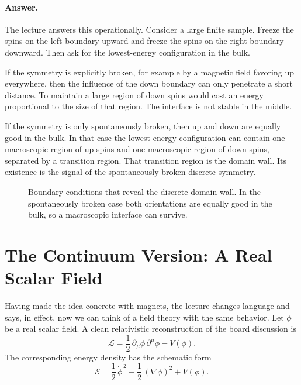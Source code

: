 \paragraph{Answer.} The lecture answers this operationally. Consider a large finite sample. Freeze the spins on the left boundary upward and freeze the spins on the right boundary downward. Then ask for the lowest-energy configuration in the bulk.

If the symmetry is explicitly broken, for example by a magnetic field favoring up everywhere, then the influence of the down boundary can only penetrate a short distance. To maintain a large region of down spins would cost an energy proportional to the size of that region. The interface is not stable in the middle.

If the symmetry is only spontaneously broken, then up and down are equally good in the bulk. In that case the lowest-energy configuration can contain one macroscopic region of up spins and one macroscopic region of down spins, separated by a transition region. That transition region is the domain wall. Its existence is the signal of the spontaneously broken discrete symmetry.

\begin{figure}[t]
\centering
{}
\caption{Boundary conditions that reveal the discrete domain wall. In the spontaneously broken case both orientations are equally good in the bulk, so a macroscopic interface can survive.}
\label{fig:lecture07-domain-wall}
\end{figure}

\section{The Continuum Version: A Real Scalar Field}

Having made the idea concrete with magnets, the lecture changes language and says, in effect, now we can think of a field theory with the same behavior. Let \(\phi\) be a real scalar field. A clean relativistic reconstruction of the board discussion is
\begin{equation}
\mathcal{L}=\frac12\,\partial_\mu\phi\,\partial^\mu\phi - V(\phi).
\label{eq:real-scalar-lagrangian-refined}
\end{equation}
The corresponding energy density has the schematic form
\begin{equation}
\mathcal{E}=\frac12\,\dot{\phi}^{\,2}+\frac12\,(\nabla\phi)^2+V(\phi).
\label{eq:real-scalar-energy-refined}
\end{equation}

